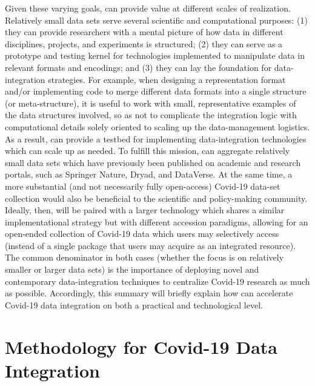\documentclass[11pt,letterpaper]{article}
\newcommand{\ATextCClr}[1]{\textcolor{atcColor}{\textbf{#1}}}
\newcommand{\CRtwo}{{\resizebox{!}{7.5pt}{\ATextCClr{CR2}}}}
\newcommand{\p}[1]{

\vspace{1.2em}#1}
\begin{document}
{\p{Given these varying goals, \CRtwo{} can provide value at different 
scales of realization.  Relatively small data 
sets serve several scientific and computational 
purposes: (1) they can provide researchers 
with a mental picture of how data in different 
disciplines, projects, and experiments is structured; 
(2) they can serve as a prototype and testing 
kernel for technologies implemented to manipulate 
data in relevant formats and encodings; and 
(3) they can lay the foundation for data-integration 
strategies.  For example, when designing a 
representation format and/or implementing code 
to merge different data formats into a single 
structure (or meta-structure), it is useful 
to work with small, representative examples 
of the data structures involved, so as not 
to complicate the integration logic with 
computational details solely oriented to 
scaling up the data-management logistics.  
As a result, \CRtwo{} can provide a 
testbed for implementing data-integration 
technologies which can scale up as needed.  
To fulfill this mission, \CRtwo{} can aggregate 
relatively small data sets which have 
previously been published on academic and research 
portals, such as Springer Nature, Dryad, and DataVerse.  
At the same time, a more substantial 
(and not necessarily fully open-access) Covid-19 
data-set collection would also be beneficial to the 
scientific and policy-making community.  Ideally, then, 
\CRtwo{} will be paired with a larger technology which shares 
a similar implementational strategy but with different 
accession paradigms, allowing for an open-ended 
collection of Covid-19 data which users may 
selectively access (instead of a single package 
that users may acquire as an integrated resource).  
The common denominator in both cases 
(whether the focus is on relatively smaller or 
larger data sets) is the 
importance of deploying novel and contemporary 
data-integration techniques to centralize 
Covid-19 research as much as possible.  
Accordingly, this summary will briefly explain 
how \CRtwo{} can accelerate Covid-19 data integration 
on both a practical and technological level.}
 
\section{Methodology for Covid-19 Data Integration}

}
\end{document}
